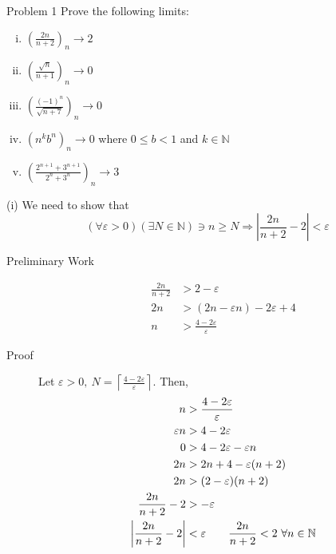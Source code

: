 \documentclass[8pt]{extarticle}
\title{}
\author{Avinash Iyer}
\date{}
\newcommand{\N}{\mathbb{N}}
\begin{document}
  \begin{problem}{Problem 1}
    Prove the following limits:
    \begin{enumerate}[(i)]
      \item $\displaystyle \left(\frac{2n}{n+2}\right)_n \rightarrow 2$
      \item $\displaystyle \left(\frac{\sqrt{n}}{n+1}\right)_n \rightarrow 0$
      \item $\displaystyle \left(\frac{(-1)^n}{\sqrt{n+7}}\right)_n \rightarrow 0$
      \item $\displaystyle \left(n^kb^n\right)_n \rightarrow 0$ where $0\leq b < 1$ and $k\in\N$
      \item $\displaystyle \left(\frac{2^{n+1}+3^{n+1}}{2^n + 3^n}\right)_n \rightarrow 3$
    \end{enumerate}
    \tcblower
    \begin{problem}{(i)}
     We need to show that
      \[(\forall \varepsilon > 0)(\exists N\in\N) \ni n \geq N \Rightarrow \left|\frac{2n}{n+2} - 2\right| < \varepsilon\]
      \begin{description}
        \item[Preliminary Work] 
          \begin{align*}
            \frac{2n}{n+2} &> 2-\varepsilon\\
            2n &> (2n - \varepsilon n) - 2\varepsilon + 4\\
            n &> \frac{4-2\varepsilon}{\varepsilon}
          \end{align*}
        \item[Proof] Let $\varepsilon > 0,~\displaystyle N = \left\lceil\frac{4-2\varepsilon}{\varepsilon}\right\rceil$. Then,
          \begin{align*}
            n &> \frac{4-2\varepsilon}{\varepsilon}\\
            \varepsilon n &> 4-2\varepsilon\\
            0 &> 4-2\varepsilon-\varepsilon n\\
            2n &> 2n + 4 - \varepsilon (n+2)\\
            2n &> (2-\varepsilon)(n+2)\\
            \frac{2n}{n+2} - 2 &> -\varepsilon\\
            \left|\frac{2n}{n+2}-2\right| &< \varepsilon \tag*{$\displaystyle \frac{2n}{n+2}< 2~\forall n\in\N$} 
          \end{align*}
      \end{description}
    \end{problem}

\end{problem}
\end{document}
